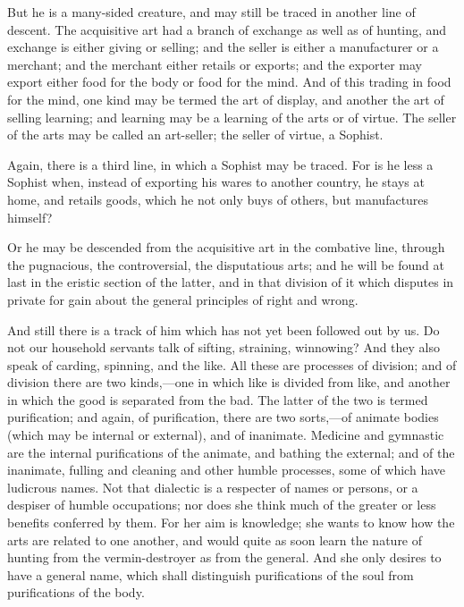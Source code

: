 \documentclass[11pt,letter]{article}
\begin{document}
\par  But he is a many-sided creature, and may still be traced in another line of descent. The acquisitive art had a branch of exchange as well as of hunting, and exchange is either giving or selling; and the seller is either a manufacturer or a merchant; and the merchant either retails or exports; and the exporter may export either food for the body or food for the mind. And of this trading in food for the mind, one kind may be termed the art of display, and another the art of selling learning; and learning may be a learning of the arts or of virtue. The seller of the arts may be called an art-seller; the seller of virtue, a Sophist.

\par  Again, there is a third line, in which a Sophist may be traced. For is he less a Sophist when, instead of exporting his wares to another country, he stays at home, and retails goods, which he not only buys of others, but manufactures himself?

\par  Or he may be descended from the acquisitive art in the combative line, through the pugnacious, the controversial, the disputatious arts; and he will be found at last in the eristic section of the latter, and in that division of it which disputes in private for gain about the general principles of right and wrong.

\par  And still there is a track of him which has not yet been followed out by us. Do not our household servants talk of sifting, straining, winnowing? And they also speak of carding, spinning, and the like. All these are processes of division; and of division there are two kinds,—one in which like is divided from like, and another in which the good is separated from the bad. The latter of the two is termed purification; and again, of purification, there are two sorts,—of animate bodies (which may be internal or external), and of inanimate. Medicine and gymnastic are the internal purifications of the animate, and bathing the external; and of the inanimate, fulling and cleaning and other humble processes, some of which have ludicrous names. Not that dialectic is a respecter of names or persons, or a despiser of humble occupations; nor does she think much of the greater or less benefits conferred by them. For her aim is knowledge; she wants to know how the arts are related to one another, and would quite as soon learn the nature of hunting from the vermin-destroyer as from the general. And she only desires to have a general name, which shall distinguish purifications of the soul from purifications of the body.
\end{document}
